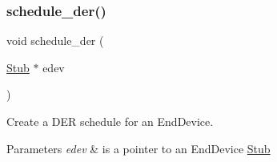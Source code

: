 \subsubsection{\texorpdfstring{schedule\+\_\+der()}{schedule\_der()}}
{\footnotesize\ttfamily void schedule\+\_\+der (\begin{DoxyParamCaption}\item[{\hyperlink{structStub}{Stub} $\ast$}]{edev }\end{DoxyParamCaption})}



Create a D\+ER schedule for an End\+Device. 


\begin{DoxyParams}{Parameters}
{\em edev} & is a pointer to an End\+Device \hyperlink{structStub}{Stub} \\
\hline
\end{DoxyParams}
